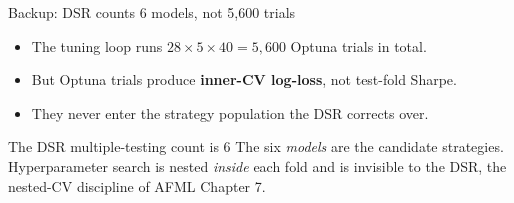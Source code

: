 \documentclass[aspectratio=169, t]{beamer}
\begin{document}
\begin{frame}{Backup: DSR counts 6 models, not 5{,}600 trials}
\vspace{-0.4em}

\begin{itemize}\footnotesize
  \item The tuning loop runs $28 \times 5 \times 40 = 5{,}600$ Optuna trials in total.
  \item But Optuna trials produce \textbf{inner-CV log-loss}, not test-fold Sharpe.
  \item They never enter the strategy population the DSR corrects over.
\end{itemize}

\vspace{0.5em}
{
\begin{block}{The DSR multiple-testing count is 6}
\footnotesize
The six \emph{models} are the candidate strategies. Hyperparameter search is nested \emph{inside} each fold and is invisible to the DSR, the nested-CV discipline of AFML Chapter 7.
\end{block}
}
\end{frame}
\end{document}
